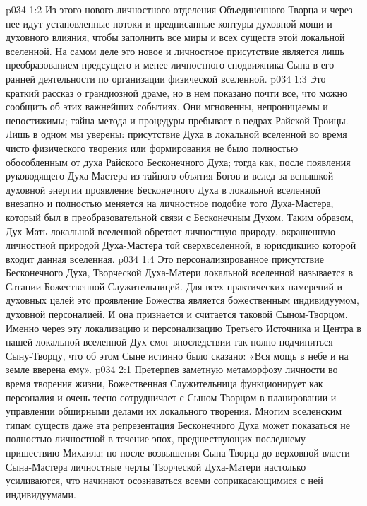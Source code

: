 \vs p034 1:2 Из этого нового личностного отделения Объединенного Творца и через нее идут установленные потоки и предписанные контуры духовной мощи и духовного влияния, чтобы заполнить все миры и всех существ этой локальной вселенной. На самом деле это новое и личностное присутствие является лишь преобразованием предсущего и менее личностного сподвижника Сына в его ранней деятельности по организации физической вселенной.
\vs p034 1:3 \pc Это краткий рассказ о грандиозной драме, но в нем показано почти все, что можно сообщить об этих важнейших событиях. Они мгновенны, непроницаемы и непостижимы; тайна метода и процедуры пребывает в недрах Райской Троицы. Лишь в одном мы уверены: присутствие Духа в локальной вселенной во время чисто физического творения или формирования не было полностью обособленным от духа Райского Бесконечного Духа; тогда как, после появления руководящего Духа\hyp{}Мастера из тайного объятия Богов и вслед за вспышкой духовной энергии проявление Бесконечного Духа в локальной вселенной внезапно и полностью меняется на личностное подобие того Духа\hyp{}Мастера, который был в преобразовательной связи с Бесконечным Духом. Таким образом, Дух\hyp{}Мать локальной вселенной обретает личностную природу, окрашенную личностной природой Духа\hyp{}Мастера той сверхвселенной, в юрисдикцию которой входит данная вселенная.
\vs p034 1:4 Это персонализированное присутствие Бесконечного Духа, Творческой Духа\hyp{}Матери локальной вселенной называется в Сатании Божественной Служительницей. Для всех практических намерений и духовных целей это проявление Божества является божественным индивидуумом, духовной персоналией. И она признается и считается таковой Сыном\hyp{}Творцом. Именно через эту локализацию и персонализацию Третьего Источника и Центра в нашей локальной вселенной Дух смог впоследствии так полно подчиниться Сыну\hyp{}Творцу, что об этом Сыне истинно было сказано: «Вся мощь в небе и на земле вверена ему».
\vs p034 2:1 Претерпев заметную метаморфозу личности во время творения жизни, Божественная Служительница функционирует как персоналия и очень тесно сотрудничает с Сыном\hyp{}Творцом в планировании и управлении обширными делами их локального творения. Многим вселенским типам существ даже эта репрезентация Бесконечного Духа может показаться не полностью личностной в течение эпох, предшествующих последнему пришествию Михаила; но после возвышения Сына\hyp{}Творца до верховной власти Сына\hyp{}Мастера личностные черты Творческой Духа\hyp{}Матери настолько усиливаются, что начинают осознаваться всеми соприкасающимися с ней индивидуумами.
